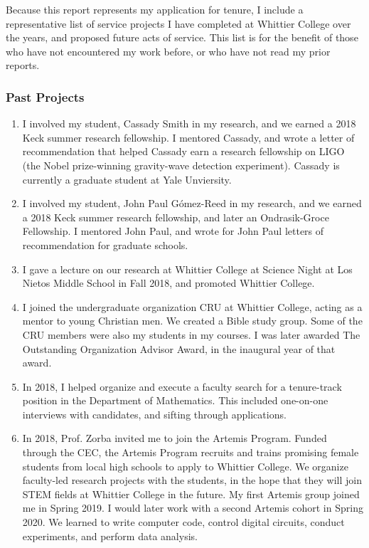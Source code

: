 \documentclass[../../../main.tex]{subfiles}
\begin{document}
\label{sec:service_summary}

Because this report represents my application for tenure, I include a representative list of service projects I have completed at Whittier College over the years, and proposed future acts of service.  This list is for the benefit of those who have not encountered my work before, or who have not read my prior reports.
\\
\vspace{0.15cm}
\subsubsection{Past Projects}
\small
\begin{enumerate}
\item I involved my student, Cassady Smith in my research, and we earned a 2018 Keck summer research fellowship.  I mentored Cassady, and wrote a letter of recommendation that helped Cassady earn a research fellowship on LIGO (the Nobel prize-winning gravity-wave detection experiment).  Cassady is currently a graduate student at Yale Unviersity.
\item I involved my student, John Paul G\'{o}mez-Reed in my research, and we earned a 2018 Keck summer research fellowship, and later an Ondrasik-Groce Fellowship.  I mentored John Paul, and wrote for John Paul letters of recommendation for graduate schools.
\item I gave a lecture on our research at Whittier College at Science Night at Los Nietos Middle School in Fall 2018, and promoted Whittier College.
\item I joined the undergraduate organization CRU at Whittier College, acting as a mentor to young Christian men.  We created a Bible study group.  Some of the CRU members were also my students in my courses.  I was later awarded The Outstanding Organization Advisor Award, in the inaugural year of that award.
\item In 2018, I helped organize and execute a faculty search for a tenure-track position in the Department of Mathematics.  This included one-on-one interviews with candidates, and sifting through applications.
\item In 2018, Prof. Zorba invited me to join the Artemis Program.  Funded through the CEC, the Artemis Program recruits and trains promising female students from local high schools to apply to Whittier College.  We organize faculty-led research projects with the students, in the hope that they will join STEM fields at Whittier College in the future.  My first Artemis group joined me in Spring 2019.  I would later work with a second Artemis cohort in Spring 2020.  We learned to write computer code, control digital circuits, conduct experiments, and perform data analysis.

\end{enumerate}
\end{document}
